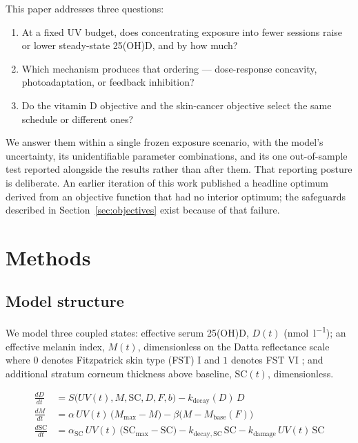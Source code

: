 \documentclass[11pt]{article}
\newcommand{\nmol}{\si{\nano\mole\per\litre}}
\begin{document}
This paper addresses three questions:

\begin{enumerate}
\item At a fixed UV budget, does concentrating exposure into fewer
      sessions raise or lower steady-state 25(OH)D, and by how much?
\item Which mechanism produces that ordering --- dose-response
      concavity, photoadaptation, or feedback inhibition?
\item Do the vitamin D objective and the skin-cancer objective select
      the same schedule or different ones?
\end{enumerate}

We answer them within a single frozen exposure scenario, with the
model's uncertainty, its unidentifiable parameter combinations, and
its one out-of-sample test reported alongside the results rather than
after them. That reporting posture is deliberate. An
earlier iteration of this work published a headline optimum derived
from an objective function that had no interior optimum; the
safeguards described in Section~\ref{sec:objectives} exist because of
that failure.

\section{Methods}

\subsection{Model structure}

We model three coupled states: effective serum 25(OH)D, $D(t)$
(\nmol); an effective melanin index, $M(t)$, dimensionless on the
Datta reflectance scale where $0$ denotes Fitzpatrick skin type (FST)
I and $1$ denotes FST VI \citep{datta2019}; and additional stratum
corneum thickness above baseline, $\mathrm{SC}(t)$, dimensionless.

\begin{align}
\frac{dD}{dt}  &= S\big(UV(t), M, \mathrm{SC}, D, F, b\big) - k_{\mathrm{decay}}(D)\, D \\[2pt]
\frac{dM}{dt}  &= \alpha\, UV(t)\,\big(M_{\max} - M\big) - \beta\big(M - M_{\mathrm{base}}(F)\big) \\[2pt]
\frac{d\mathrm{SC}}{dt} &= \alpha_{\mathrm{SC}}\, UV(t)\,\big(\mathrm{SC}_{\max} - \mathrm{SC}\big) - k_{\mathrm{decay,SC}}\,\mathrm{SC} - k_{\mathrm{damage}}\, UV(t)\, \mathrm{SC}
\end{align}
\end{document}

